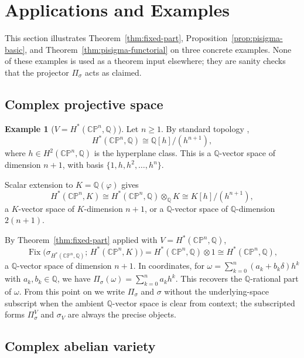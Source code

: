 \documentclass[11pt, a4paper]{amsart}
\theoremstyle{definition}
\newtheorem{example}[theorem]{Example}
\newcommand{\Q}{\mathbb{Q}}
\newcommand{\Fix}{\operatorname{Fix}}
\newcommand{\CP}{\mathbb{CP}}
\begin{document}
\section{Applications and Examples}
\label{sec:examples}

This section illustrates Theorem~\ref{thm:fixed-part},
Proposition~\ref{prop:pisigma-basic}, and
Theorem~\ref{thm:pisigma-functorial} on three concrete examples.
None of these examples is used as a theorem input elsewhere; they
are sanity checks that the projector $\Pi_\sigma$ acts as claimed.

\subsection{Complex projective space}

\begin{example}[$V = H^*(\CP^n, \Q)$]
\label{ex:cpn}
Let $n \geq 1$. By standard topology
\cite[Theorem~3.19]{Hatcher},
\[
  H^*(\CP^n, \Q) \cong \Q[h]/(h^{n+1}),
\]
where $h \in H^2(\CP^n, \Q)$ is the hyperplane class.
This is a $\Q$-vector space of dimension $n + 1$, with basis
$\{1, h, h^2, \ldots, h^n\}$.

Scalar extension to $K = \Q(\varphi)$ gives
\[
  H^*(\CP^n, K) \cong H^*(\CP^n, \Q) \otimes_\Q K
  \cong K[h]/(h^{n+1}),
\]
a $K$-vector space of $K$-dimension $n + 1$, or a $\Q$-vector space
of $\Q$-dimension $2(n+1)$.

By Theorem~\ref{thm:fixed-part} applied with $V = H^*(\CP^n, \Q)$,
\[
  \Fix\big(\sigma_{H^*(\CP^n, \Q)};\, H^*(\CP^n, K)\big)
  = H^*(\CP^n, \Q) \otimes 1 \cong H^*(\CP^n, \Q),
\]
a $\Q$-vector space of dimension $n + 1$. In coordinates, for
$\omega = \sum_{k=0}^n (a_k + b_k \delta) h^k$ with $a_k, b_k \in
\Q$, we have
$\Pi_\sigma(\omega) = \sum_{k=0}^n a_k h^k$. This recovers the
$\Q$-rational part of $\omega$. From this point on we write
$\Pi_\sigma$ and $\sigma$ without the underlying-space subscript
when the ambient $\Q$-vector space is clear from context; the
subscripted forms $\Pi_\sigma^V$ and $\sigma_V$ are always the
precise objects.
\end{example}

\subsection{Complex abelian variety}
\end{document}
